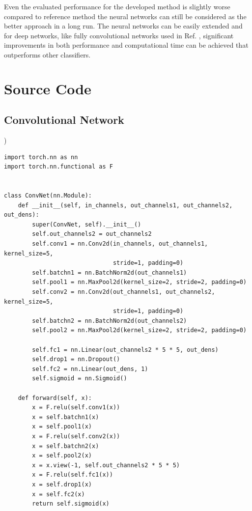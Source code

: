 \documentclass[aps,prb,10pt,twocolumn,groupedaddress]{revtex4-1}
\begin{document}
Even the evaluated performance for the developed method is slightly worse compared to reference method the neural networks can still be considered as the better approach in a long run. The neural networks can be easily extended and for deep networks, like fully convolutional networks used in Ref. \cite{hu}, significant improvements in both performance and computational time can be achieved that outperforms other classifiers. 


\appendix
\onecolumngrid
\section{Source Code}
\label{appendix:a}
\lstset{language=Python}
\subsection{Convolutional Network})
\begin{lstlisting}
import torch.nn as nn
import torch.nn.functional as F


class ConvNet(nn.Module):
	def __init__(self, in_channels, out_channels1, out_channels2, out_dens):
		super(ConvNet, self).__init__()
		self.out_channels2 = out_channels2
		self.conv1 = nn.Conv2d(in_channels, out_channels1, kernel_size=5,
		                       stride=1, padding=0)
		self.batchn1 = nn.BatchNorm2d(out_channels1)
		self.pool1 = nn.MaxPool2d(kernel_size=2, stride=2, padding=0)
		self.conv2 = nn.Conv2d(out_channels1, out_channels2, kernel_size=5,
		                       stride=1, padding=0)
		self.batchn2 = nn.BatchNorm2d(out_channels2)
		self.pool2 = nn.MaxPool2d(kernel_size=2, stride=2, padding=0)

		self.fc1 = nn.Linear(out_channels2 * 5 * 5, out_dens)
		self.drop1 = nn.Dropout()
		self.fc2 = nn.Linear(out_dens, 1)
		self.sigmoid = nn.Sigmoid()

	def forward(self, x):
		x = F.relu(self.conv1(x))
		x = self.batchn1(x)
		x = self.pool1(x)
		x = F.relu(self.conv2(x))
		x = self.batchn2(x)
		x = self.pool2(x)
		x = x.view(-1, self.out_channels2 * 5 * 5)
		x = F.relu(self.fc1(x))
		x = self.drop1(x)
		x = self.fc2(x)
		return self.sigmoid(x)
\end{lstlisting}
\end{document}
